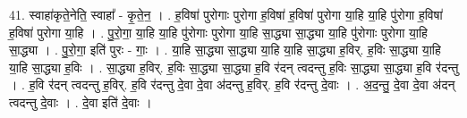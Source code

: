 \documentclass[17pt]{extarticle}
\begin{document}
41. स्वाहा॑कृते॒नेति॒ स्वाहा᳚ - कृ॒ते॒न॒ । . ह॒विषा॑ पुरोगाः पुरोगा ह॒विषा॑ ह॒विषा॑ पुरोगा या॒हि या॒हि पु॑रोगा ह॒विषा॑ ह॒विषा॑ पुरोगा या॒हि । . पु॒रो॒गा॒ या॒हि या॒हि पु॑रोगाः पुरोगा या॒हि सा॒द्ध्या सा॒द्ध्या या॒हि पु॑रोगाः पुरोगा या॒हि सा॒द्ध्या । . पु॒रो॒गा॒ इति॑ पुरः - गाः॒ । . या॒हि सा॒द्ध्या सा॒द्ध्या या॒हि या॒हि सा॒द्ध्या ह॒विर्. ह॒विः सा॒द्ध्या या॒हि या॒हि सा॒द्ध्या ह॒विः । . सा॒द्ध्या ह॒विर्. ह॒विः सा॒द्ध्या सा॒द्ध्या ह॒वि र॑दन् त्वदन्तु ह॒विः सा॒द्ध्या सा॒द्ध्या ह॒वि र॑दन्तु । . ह॒वि र॑दन् त्वदन्तु ह॒विर्. ह॒वि र॑दन्तु दे॒वा दे॒वा अ॑दन्तु ह॒विर्. ह॒वि र॑दन्तु दे॒वाः । . अ॒द॒न्तु॒ दे॒वा दे॒वा अ॑दन् त्वदन्तु दे॒वाः । . दे॒वा इति॑ दे॒वाः । \newline
\pagebreak
\end{document}
